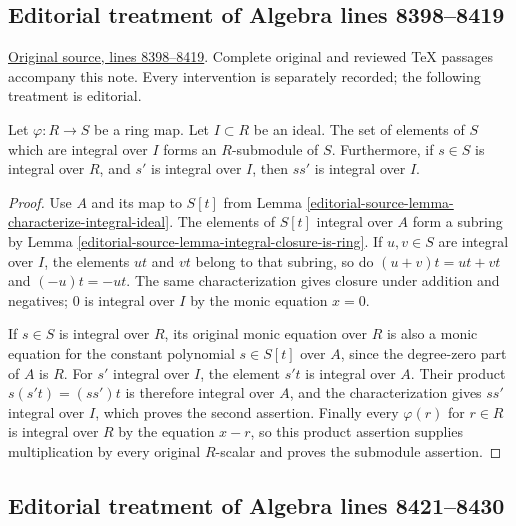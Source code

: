 \subsection{Editorial treatment of Algebra lines 8398--8419}

\hypertarget{algebra-context-092}{}

\noindent\href{https://github.com/stacks/stacks-project/blob/a04446e57ec1fbc252a871afcec7752fb2807b14/algebra.tex\#L8398}{Original source, lines 8398--8419}. Complete original and reviewed TeX passages accompany this note. Every intervention is separately recorded; the following treatment is editorial.


\begin{lemma}
\label{editorial-source-lemma-integral-over-ideal-is-submodule}
Let $\varphi : R \to S$ be a ring map.
Let $I \subset R$ be an ideal.
The set of elements of $S$ which are integral
over $I$ forms an $R$-submodule of $S$.
Furthermore, if $s \in S$ is integral over
$R$, and $s'$ is integral over $I$, then
$ss'$ is integral over $I$.
\end{lemma}

\begin{proof}
Use $A$ and its map to $S[t]$ from
Lemma \ref{editorial-source-lemma-characterize-integral-ideal}. The elements of
$S[t]$ integral over $A$ form a subring by
Lemma \ref{editorial-source-lemma-integral-closure-is-ring}. If $u,v\in S$
are integral over $I$, the elements $ut$ and $vt$ belong to
that subring, so do $(u+v)t=ut+vt$ and $(-u)t=-ut$.
The same characterization gives closure under addition and negatives;
$0$ is integral over $I$ by the monic equation $x=0$.

If $s\in S$ is integral over $R$, its original monic equation
over $R$ is also a monic equation for the constant polynomial
$s\in S[t]$ over $A$, since the degree-zero part of $A$ is
$R$. For $s'$ integral over $I$, the element $s't$ is integral
over $A$. Their product $s(s't)=(ss')t$ is therefore integral
over $A$, and the characterization gives $ss'$ integral over
$I$, which proves the second assertion. Finally every
$\varphi(r)$ for $r\in R$ is integral over $R$ by the equation
$x-r$, so this product assertion supplies multiplication by
every original $R$-scalar and proves the submodule assertion.
\end{proof}


\subsection{Editorial treatment of Algebra lines 8421--8430}

